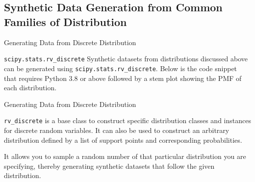 \documentclass[aspectratio=169,xcolor=dvipsnames,svgnames,x11names,fleqn]{beamer}
\begin{document}
    \subsection{Synthetic Data Generation from Common Families of Distribution}
    
    
    \begin{frame}
    \subsectionpage
\end{frame}
    
    
    \begin{frame}[containsverbatim]{Generating Data from Discrete Distribution}
    
    \begin{gradblock}{\texttt{scipy.stats.rv\_discrete}}
        Synthetic datasets from distributions discussed above can be generated using \texttt{scipy.stats.rv\_discrete}. Below is the code snippet that requires Python 3.8 or above followed by a stem plot showing the PMF of each distribution.
    \end{gradblock}
\end{frame}
    

\begin{frame}[containsverbatim]{Generating Data from Discrete Distribution}

    \begin{facts}
        \texttt{rv\_discrete} is a base class to construct specific distribution classes and instances for discrete random variables. It can also be used to construct an arbitrary distribution defined by a list of support points and corresponding probabilities.
    
    It allows you to sample a random number of that particular distribution you are specifying, thereby generating synthetic datasets that follow the given distribution.
    \end{facts}
    
\end{frame}
    
\end{document}
